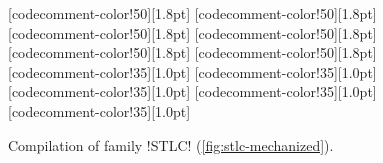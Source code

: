 \begin{figure}
\begin{minipage}{\textwidth}
\begin{multicols}{2}
[codecomment-color!50][1.8pt]
[codecomment-color!50][1.8pt]
[codecomment-color!50][1.8pt]
[codecomment-color!50][1.8pt]
[codecomment-color!50][1.8pt]
[codecomment-color!50][1.8pt]
[codecomment-color!35][1.0pt]
[codecomment-color!35][1.0pt]
[codecomment-color!35][1.0pt]
[codecomment-color!35][1.0pt]
[codecomment-color!35][1.0pt]

\end{multicols}
\end{minipage}

\vspace{-12pt}

\caption{Compilation of family \lsti!STLC! (\cref{fig:stlc-mechanized}).}
\label{fig:stlc-compiled}
\end{figure}